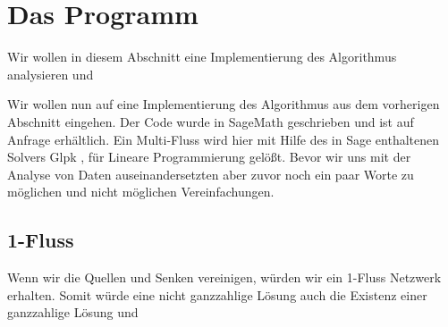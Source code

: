 \section{Das Programm}

Wir wollen in diesem Abschnitt eine Implementierung des Algorithmus analysieren und 

Wir wollen nun auf eine Implementierung des Algorithmus aus dem vorherigen Abschnitt eingehen. Der Code wurde in SageMath \cite{sage} geschrieben und ist auf Anfrage erhältlich. Ein Multi-Fluss wird hier mit Hilfe des in Sage enthaltenen Solvers Glpk \cite{glpk}, für Lineare Programmierung gelößt. Bevor wir uns mit der Analyse von Daten auseinandersetzten aber zuvor noch ein paar Worte zu möglichen und nicht möglichen Vereinfachungen.




\subsection{1-Fluss}

Wenn wir die Quellen und Senken vereinigen, würden wir ein 1-Fluss Netzwerk erhalten. Somit würde eine nicht ganzzahlige Lösung auch die  Existenz einer ganzzahlige Lösung und



